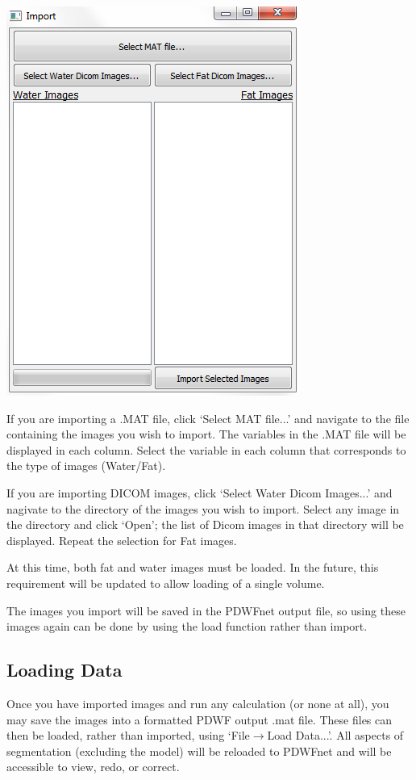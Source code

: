 \documentclass[twoside,a4paper]{refart}
\begin{document}
\includegraphics[width=.7\textwidth]{ImportGUI.PNG}

If you are importing a .MAT file, click `Select MAT file...' and navigate to the file containing the images you wish to import. The variables in the .MAT file will be displayed in each column. Select the variable in each column that corresponds to the type of images (Water/Fat).

If you are importing DICOM images, click `Select Water Dicom Images...' and nagivate to the directory of the images you wish to import. Select any image in the directory and click `Open'; the list of Dicom images in that directory will be displayed. Repeat the selection for Fat images.

At this time, both fat and water images must be loaded. In the future, this requirement will be updated to allow loading of a single volume.

The images you import will be saved in the PDWFnet output file, so using these images again can be done by using the load function rather than import.


\subsection{Loading Data}

Once you have imported images and run any calculation (or none at all), you may save the images into a formatted PDWF output .mat file. These files can then be loaded, rather than imported, using `File$\rightarrow$Load Data...'. All aspects of segmentation (excluding the model) will be reloaded to PDWFnet and will be accessible to view, redo, or correct.
\end{document}
